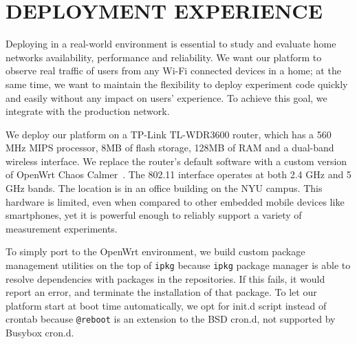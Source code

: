 \chapter{DEPLOYMENT EXPERIENCE} 
\label{ssec.deployment}
Deploying \sysname in a real-world environment is essential to study and evaluate home networks availability, performance and reliability. We want our platform to observe real traffic of users from any Wi-Fi connected devices in a home; at the same time, we want to maintain the flexibility to deploy experiment code quickly and easily without any impact on users' experience. To achieve this goal, we integrate \sysname with the production network.

We deploy our platform on a TP-Link TL-WDR3600 router, which has a 560 MHz MIPS processor, 8MB of flash storage, 128MB of RAM and a dual-band wireless interface. We replace the router's default software with a custom version of OpenWrt Chaos Calmer~\cite{openwrt}. The 802.11 interface operates at both 2.4 GHz and 5 GHz bands. The location is in an office building on the NYU campus. This hardware is limited, even when compared to other embedded mobile devices like smartphones, yet it is powerful enough to reliably support a variety of measurement experiments.

To simply port to the OpenWrt environment, we build custom package management utilities on the top of \texttt{ipkg} because \texttt{ipkg} package manager is able to resolve dependencies with packages in the repositories. If this fails, it would report an error, and terminate the installation of that package. To let our platform start at boot time automatically, we opt for init.d script instead of crontab because \texttt{@reboot} is an extension to the BSD cron.d, not supported by Busybox cron.d.